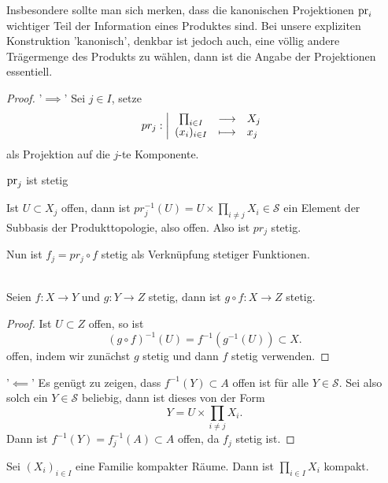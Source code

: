 \begin{remark*}
    Insbesondere sollte man sich merken, dass die kanonischen Projektionen $\operatorname{pr}_i$ wichtiger Teil der Information eines Produktes sind. Bei unsere expliziten Konstruktion 'kanonisch', denkbar ist jedoch auch, eine völlig andere Trägermenge des Produkts zu wählen, dann ist die Angabe der Projektionen essentiell.
\end{remark*}
\begin{proof}
    '$\implies$' Sei $j\in I$, setze
        \begin{equation*}
        pr_j: \left| \begin{array}{c c l} 
        \prod_{i\in I}  & \longrightarrow & X_j \\
        (x_i)_{i \in I} & \longmapsto &  x_j
        \end{array} \right.
    \end{equation*}
    als Projektion auf die $j$-te Komponente.
     \begin{claim}
        $\operatorname{pr}_j$ ist stetig
    \end{claim}
    \begin{subproof}
        Ist $U\subset X_j$ offen, dann ist $pr_j^{-1}(U) = U\times \prod_{i\neq j} X_i\in \mathcal{S}$ ein Element der Subbasis der Produkttopologie, also offen. Also ist $pr_j$ stetig.
    \end{subproof}
    Nun ist $f_j = pr_j \circ  f$ stetig als Verknüpfung stetiger Funktionen.
    \begin{recap}
        \\
        Seien $f:X\to Y$ und $g:Y\to Z$ stetig, dann ist $g\circ  f : X \to  Z$ stetig.
        \begin{proof}
            Ist $U\subset Z$ offen, so ist
            \[
                (g \circ  f) ^{-1}(U) = f^{-1}(g^{-1}(U)) \subset X
            .\] 
            offen, indem wir zunächst $g$ stetig und dann  $f$ stetig verwenden.
        \end{proof}
    \end{recap}
    '$\impliedby$' Es genügt zu zeigen, dass $f^{-1}(Y)\subset A$ offen ist für alle $Y\in \mathcal{S}$. Sei also solch ein $Y\in \mathcal{S}$ beliebig, dann ist dieses von der Form
    \[
    Y = U\times \prod_{i\neq j} X_i
    .\] 
    Dann ist $f^{-1}(Y) = f^{-1}_j(A)\subset A$ offen, da $f_j$ stetig ist.
\end{proof}
\begin{theorem}\label{thm:tychonoff}
    Sei $(X_i)_{i \in I}$ eine Familie kompakter Räume. Dann ist $\prod _{i \in I} X_i$ kompakt.
\end{theorem}
